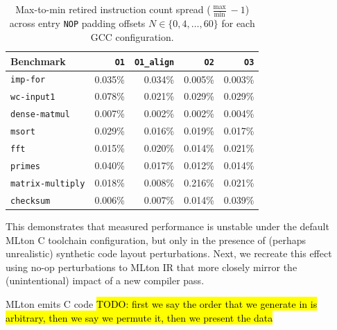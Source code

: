 \begin{table}[htbp]
  \centering
  \caption{Max-to-min retired instruction count spread ($\frac{\max}{\min} - 1$) across entry \texttt{NOP} padding offsets $N \in \{0, 4, \dots, 60\}$ for each GCC configuration.}
  \label{tab:compare_o1_insts}
  \begin{tabular}{lrrrr}
    \toprule
    \textbf{Benchmark} & \textbf{\texttt{O1}} & \textbf{\texttt{O1\_align}} & \textbf{\texttt{O2}} & \textbf{\texttt{O3}} \\
    \midrule
    \texttt{imp-for}         & 0.035\% & 0.034\% & 0.005\% & 0.003\% \\
    \texttt{wc-input1}       & 0.078\% & 0.021\% & 0.029\% & 0.029\% \\
    \texttt{dense-matmul}    & 0.007\% & 0.002\% & 0.002\% & 0.004\% \\
    \texttt{msort}           & 0.029\% & 0.016\% & 0.019\% & 0.017\% \\
    \texttt{fft}             & 0.015\% & 0.020\% & 0.014\% & 0.021\% \\
    \texttt{primes}          & 0.040\% & 0.017\% & 0.012\% & 0.014\% \\
    \texttt{matrix-multiply} & 0.018\% & 0.008\% & 0.216\% & 0.021\% \\
    \texttt{checksum}        & 0.006\% & 0.007\% & 0.014\% & 0.039\% \\
    \bottomrule
  \end{tabular}
\end{table}

This demonstrates that measured performance is unstable under the default MLton
C toolchain configuration, but only in the presence of (perhaps unrealistic)
synthetic code layout perturbations. Next, we recreate this effect using no-op
perturbations to MLton IR that more closely mirror the (unintentional) impact of
a new compiler pass.

MLton emits C code \hl{TODO: first we say the order that we generate in is
  arbitrary, then we say we permute it, then we present the data}

\FloatBarrier

